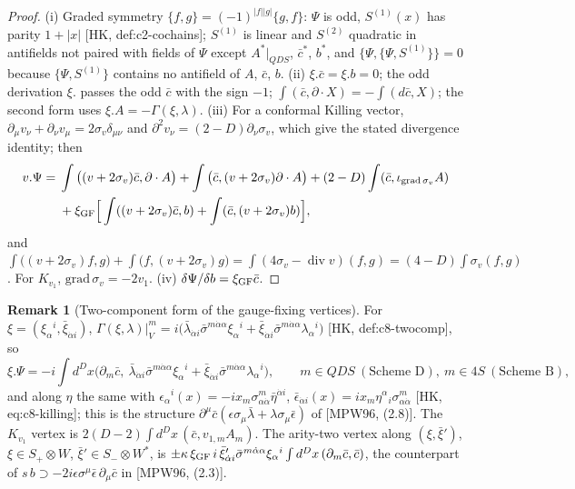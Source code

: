 \documentclass[11pt]{article}
\theoremstyle{definition}
\newtheorem{remark}[definition]{Remark}
\numberwithin{equation}{section}
\begin{document}
\begin{proof}
(i) Graded symmetry $\{f,g\}=(-1)^{|f||g|}\{g,f\}$: $\Psi$ is odd, $S^{(1)}(x)$ has parity $1+|x|$ [HK, def:c2-cochains]; $S^{(1)}$ is linear and $S^{(2)}$ quadratic in antifields not paired with fields of $\Psi$ except $A^*|_{QDS}$, $\bar c^*$, $b^*$, and $\{\Psi,\{\Psi,S^{(1)}\}\}=0$ because $\{\Psi,S^{(1)}\}$ contains no antifield of $A$, $\bar c$, $b$. (ii) $\xi.\bar c=\xi.b=0$; the odd derivation $\xi.$ passes the odd $\bar c$ with the sign $-1$; $\int(\bar c,\partial\cdot X)=-\int(d\bar c,X)$; the second form uses $\xi.A=-\Gamma(\xi,\lambda)$. (iii) For a conformal Killing vector, $\partial_\mu v_\nu+\partial_\nu v_\mu=2\sigma_v\delta_{\mu\nu}$ and $\partial^2v_\nu=(2-D)\partial_\nu\sigma_v$, which give the stated divergence identity; then
\[
\begin{aligned}
v.\Psi={}&\int\big((v+2\sigma_v)\bar c,\partial\cdot A\big)+\int\big(\bar c,(v+2\sigma_v)\partial\cdot A\big)+(2-D)\int(\bar c,\iota_{\mathrm{grad}\,\sigma_v}A)\\
&+\xi_{\rm GF}\Big[\int((v+2\sigma_v)\bar c,b)+\int(\bar c,(v+2\sigma_v)b)\Big],
\end{aligned}
\]
and $\int\big((v+2\sigma_v)f,g\big)+\int\big(f,(v+2\sigma_v)g\big)=\int(4\sigma_v-\operatorname{div}v)(f,g)=(4-D)\int\sigma_v(f,g)$. For $K_{v_1}$, $\mathrm{grad}\,\sigma_v=-2v_1$. (iv) $\delta\Psi/\delta b=\xi_{\rm GF}\bar c$.
\end{proof}

\begin{remark}[Two-component form of the gauge-fixing vertices]
For $\xi=(\xi_\alpha{}^i,\bar\xi_{\dot\alpha i})$, $\Gamma(\xi,\lambda)|_V^m=i\big(\bar\lambda_{\dot\alpha i}\bar\sigma^{m\dot\alpha\alpha}\xi_\alpha{}^i+\bar\xi_{\dot\alpha i}\bar\sigma^{m\dot\alpha\alpha}\lambda_\alpha{}^i\big)$ [HK, def:c8-twocomp], so
\[
\xi.\Psi=-i\int d^Dx\Big(\partial_m\bar c,\ \bar\lambda_{\dot\alpha i}\bar\sigma^{m\dot\alpha\alpha}\xi_\alpha{}^i+\bar\xi_{\dot\alpha i}\bar\sigma^{m\dot\alpha\alpha}\lambda_\alpha{}^i\Big),\qquad m\in QDS\ (\text{Scheme D}),\ m\in4S\ (\text{Scheme B}),
\]
and along $\eta$ the same with $\epsilon_\alpha{}^i(x)=-ix_m\sigma^m_{\alpha\dot\alpha}\bar\eta^{\dot\alpha i}$, $\bar\epsilon_{\dot\alpha i}(x)=ix_m\eta^\alpha{}_i\sigma^m_{\alpha\dot\alpha}$ [HK, eq:c8-killing]; this is the structure $\partial^\mu\bar c(\epsilon\sigma_\mu\bar\lambda+\lambda\sigma_\mu\bar\epsilon)$ of [MPW96, (2.8)]. The $K_{v_1}$ vertex is $2(D-2)\int d^Dx\,(\bar c,v_{1,m}A_m)$. The arity-two vertex along $(\xi,\bar\xi')$, $\xi\in S_+\otimes W$, $\bar\xi'\in S_-\otimes W^*$, is $\pm\kappa\,\xi_{\rm GF}\,i\,\bar\xi'_{\dot\alpha i}\bar\sigma^{m\dot\alpha\alpha}\xi_\alpha{}^i\int d^Dx\,(\partial_m\bar c,\bar c)$, the counterpart of $s\,b\supset-2i\epsilon\sigma^\mu\bar\epsilon\,\partial_\mu\bar c$ in [MPW96, (2.3)].
\end{remark}
\end{document}
